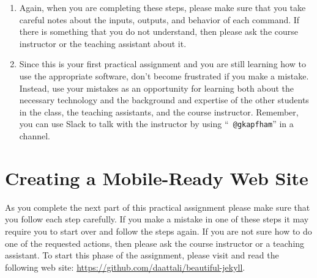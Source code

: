 \begin{enumerate}
  \item Again, when you are completing these steps, please make sure that you take careful notes about the inputs,
    outputs, and behavior of each command. If there is something that you do not understand, then please ask the course
    instructor or the teaching assistant about it.

  \item Since this is your first practical assignment and you are still learning how to use the appropriate software,
    don't become frustrated if you make a mistake. Instead, use your mistakes as an opportunity for learning both about
    the necessary technology and the background and expertise of the other students in the class, the teaching
    assistants, and the course instructor. Remember, you can use Slack to talk with the instructor by using ``{\tt
    @gkapfham}'' in a channel.

\end{enumerate}

\vspace*{-.15in}
\section*{Creating a Mobile-Ready Web Site}

As you complete the next part of this practical assignment please make sure that you follow each step carefully. If you
make a mistake in one of these steps it may require you to start over and follow the steps again. If you are not sure
how to do one of the requested actions, then please ask the course instructor or a teaching assistant. To start this
phase of the assignment, please visit and read the following web site: \url{https://github.com/daattali/beautiful-jekyll}.

